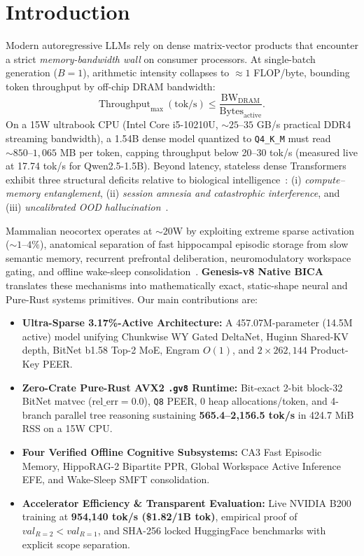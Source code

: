 \documentclass[10pt,twocolumn,letterpaper]{article}
\begin{document}
\section{Introduction}
Modern autoregressive LLMs rely on dense matrix-vector products that encounter a strict \emph{memory-bandwidth wall} on consumer processors. At single-batch generation ($B=1$), arithmetic intensity collapses to $\approx 1$ FLOP/byte, bounding token throughput by off-chip DRAM bandwidth:
\begin{equation}
\text{Throughput}_{\max}\ (\text{tok/s}) \le \frac{\text{BW}_{\text{DRAM}}}{\text{Bytes}_{\text{active}}}.
\label{eq:roofline}
\end{equation}
On a 15W ultrabook CPU (Intel Core i5-10210U, $\sim 25\text{--}35$ GB/s practical DDR4 streaming bandwidth), a 1.54B dense model quantized to \texttt{Q4\_K\_M} must read $\sim 850\text{--}1{,}065$ MB per token, capping throughput below 20--30 tok/s (measured live at 17.74 tok/s for Qwen2.5-1.5B). Beyond latency, stateless dense Transformers exhibit three structural deficits relative to biological intelligence~\cite{behrouz2024titans,friston2017active}: (i) \emph{compute--memory entanglement}, (ii) \emph{session amnesia and catastrophic interference}, and (iii) \emph{uncalibrated OOD hallucination}~\cite{farquhar2024detecting,lin2022truthfulqa}.

Mammalian neocortex operates at $\sim 20$W by exploiting extreme sparse activation ($\sim 1\text{--}4\%$), anatomical separation of fast hippocampal episodic storage from slow semantic memory, recurrent prefrontal deliberation, neuromodulatory workspace gating, and offline wake-sleep consolidation~\cite{dehaene2011experimental,friston2017active,zheng2025unbearable}. \textbf{Genesis-v8 Native BICA} translates these mechanisms into mathematically exact, static-shape neural and Pure-Rust systems primitives. Our main contributions are:
\begin{itemize}[leftmargin=*,nosep]
\item \textbf{Ultra-Sparse 3.17\%-Active Architecture:} A 457.07M-parameter (14.5M active) model unifying Chunkwise WY Gated DeltaNet, Huginn Shared-KV depth, BitNet b1.58 Top-2 MoE, Engram $O(1)$, and $2\times 262{,}144$ Product-Key PEER.
\item \textbf{Zero-Crate Pure-Rust AVX2 \texttt{.gv8} Runtime:} Bit-exact 2-bit block-32 BitNet matvec ($\text{rel\_err}=0.0$), \texttt{Q8} PEER, 0 heap allocations/token, and 4-branch parallel tree reasoning sustaining \textbf{565.4--2,156.5 tok/s} in 424.7 MiB RSS on a 15W CPU.
\item \textbf{Four Verified Offline Cognitive Subsystems:} CA3 Fast Episodic Memory, HippoRAG-2 Bipartite PPR, Global Workspace Active Inference EFE, and Wake-Sleep SMFT consolidation.
\item \textbf{Accelerator Efficiency \& Transparent Evaluation:} Live NVIDIA B200 training at \textbf{954,140 tok/s (\$1.82/1B tok)}, empirical proof of $val_{R=2} < val_{R=1}$, and SHA-256 locked HuggingFace benchmarks with explicit scope separation.
\end{itemize}
\end{document}
